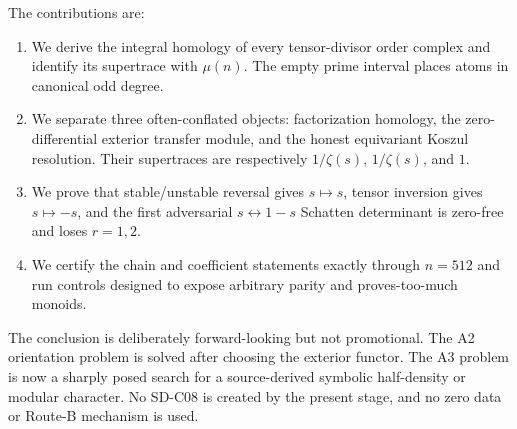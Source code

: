 The contributions are:

\begin{enumerate}
  \item We derive the integral homology of every tensor-divisor order
  complex and identify its supertrace with $\mu(n)$. The empty prime interval
  places atoms in canonical odd degree.
  \item We separate three often-conflated objects: factorization homology,
  the zero-differential exterior transfer module, and the honest equivariant
  Koszul resolution. Their supertraces are respectively
  $1/\zeta(s)$, $1/\zeta(s)$, and $1$.
  \item We prove that stable/unstable reversal gives $s\mapsto s$, tensor
  inversion gives $s\mapsto-s$, and the first adversarial
  $s\leftrightarrow1-s$ Schatten determinant is zero-free and loses
  $r=1,2$.
  \item We certify the chain and coefficient statements exactly through
  $n=512$ and run controls designed to expose arbitrary parity and
  proves-too-much monoids.
\end{enumerate}

The conclusion is deliberately forward-looking but not promotional. The A2
orientation problem is solved after choosing the exterior functor. The A3
problem is now a sharply posed search for a source-derived symbolic
half-density or modular character. No SD-C08 is created by the present
stage, and no zero data or Route-B mechanism is used.
